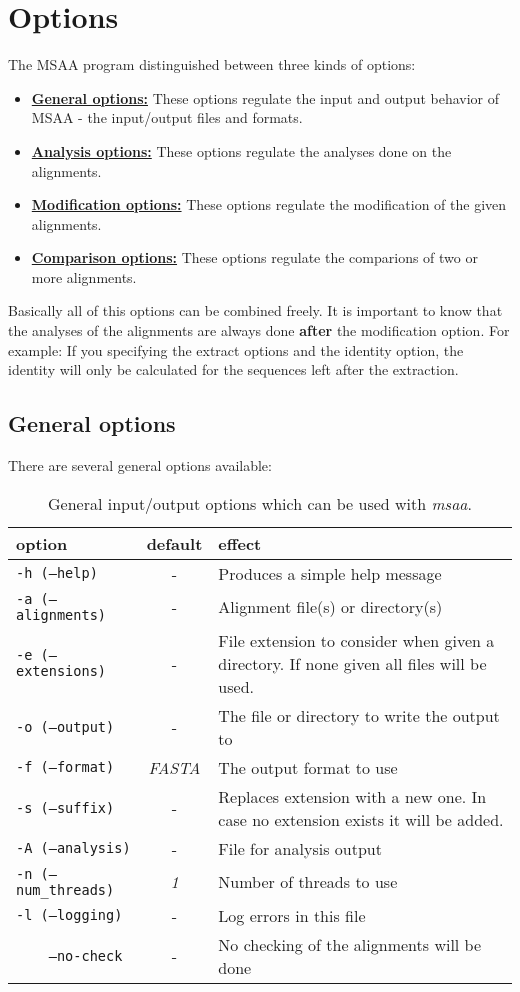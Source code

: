 \documentclass[a4paper,10pt,parskip=half]{scrartcl}
\begin{document}
\section{Options}
The MSAA program distinguished between three kinds of options:
\begin{itemize}
	\item \textbf{\hyperref[general_opts]{General options:}} These options regulate the input and output behavior of MSAA - the input/output files and formats.
	\item \textbf{\hyperref[ana_opts]{Analysis options:}} These options regulate the analyses done on the alignments.
	\item \textbf{\hyperref[mod_opts]{Modification options:}} These options regulate the modification of the given alignments.
	\item \textbf{\hyperref[comp_opts]{Comparison options:}} These options regulate the comparions of two or more alignments.
\end{itemize}

Basically all of this options can be combined freely. It is important to know that the analyses of the alignments are always done \textbf{after} the modification option. For example: If you specifying the extract options and the identity option, the identity will only be calculated for the sequences left after the extraction.

\newpage
\subsection{General options}\label{general_opts}
There are several general options available:
\begin{table}[h]
\caption{General input/output options which can be used with \textit{msaa}.}
\begin{tabular}{lcp{7cm}}\hline
option& default & effect \\\hline
\texttt{-h (--help)}&- & Produces a simple help message\\
\texttt{-a (--alignments)}&-  &Alignment file(s) or directory(s)\\
\texttt{-e (--extensions)}&- & File extension to consider when given a directory. If none given all files will be used.\\
\texttt{-o (--output)}&-    & The file or directory to write the output to\\
\texttt{-f (--format)}&\textit{FASTA}&  The output format to use\\
\texttt{-s (--suffix)}& -& Replaces extension with a new one. In case no extension exists it will be added.\\
\texttt{-A (--analysis)}&-&  File for analysis output\\
\texttt{-n (--num\_threads)}&\textit{1}& Number of threads to use\\
\texttt{-l (--logging)}& -& Log errors in this file\\
\texttt{~~~~--no-check}& -& No checking of the alignments will be done\\\hline
 \end{tabular}
\end{table}
\end{document}
